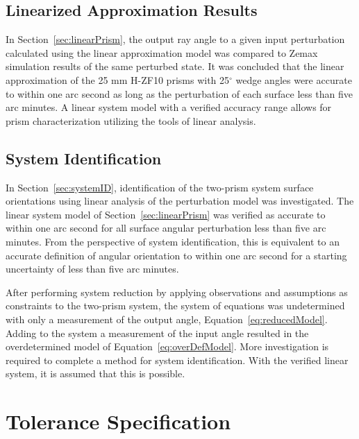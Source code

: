 \subsection{Linearized Approximation Results}
In Section~\ref{sec:linearPrism}, the output ray angle to a given input perturbation calculated using the linear approximation model was compared to Zemax simulation results of the same perturbed state. It was concluded that the linear approximation of the 25 mm H-ZF10 prisms with 25$^\circ$ wedge angles were accurate to within one arc second as long as the perturbation of each surface less than five arc minutes. A linear system model with a verified accuracy range allows for prism characterization utilizing the tools of linear analysis.

\subsection{System Identification}
In Section~\ref{sec:systemID}, identification of the two-prism system surface orientations using linear analysis of the perturbation model was investigated. The linear system model of Section~\ref{sec:linearPrism} was verified as accurate to within one arc second for all surface angular perturbation less than five arc minutes. From the perspective of system identification, this is equivalent to an accurate definition of angular orientation to within one arc second for a starting uncertainty of less than five arc minutes.

After performing system reduction by applying observations and assumptions as constraints to the two-prism system, the system of equations was undetermined with only a measurement of the output angle, Equation~\eqref{eq:reducedModel}. Adding to the system a measurement of the input angle resulted in the overdetermined model of Equation~\eqref{eq:overDefModel}. More investigation is required to complete a method for system identification. With the verified linear system, it is assumed that this is possible.


\section{Tolerance Specification}

